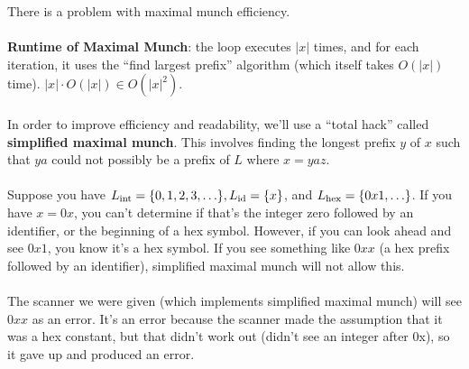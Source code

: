 \documentclass[]{article}
\DeclarePairedDelimiter{\set}{\lbrace}{\rbrace}
\theoremstyle{definition}
\begin{document}
			There is a problem with maximal munch \textendash{} efficiency.
			\\ \\
			\textbf{Runtime of Maximal Munch}: the loop executes $|x|$ times, and for each iteration, it uses the ``find largest prefix'' algorithm (which itself takes $O(|x|)$ time). $|x| \cdot O(|x|) \in O(|x|^2)$.
			\\ \\
			In order to improve efficiency and readability, we'll use a ``total hack'' called \textbf{simplified maximal munch}. This involves finding the longest prefix $y$ of $x$ such that $ya$ could not possibly be a prefix of $L$ where $x = yaz$.
			\\ \\
			Suppose you have $L_{\text{int}} = \set{0, 1, 2, 3, \ldots}, L_{\text{id}} = \set{x}$, and $L_{\text{hex}} = \set{0x1, \ldots}$. If you have $x = 0x$, you can't determine if that's the integer zero followed by an identifier, or the beginning of a hex symbol. However, if you can look ahead and see $0x1$, you know it's a hex symbol. If you see something like $0xx$ (a hex prefix followed by an identifier), simplified maximal munch will not allow this.
			\\ \\
			The scanner we were given (which implements simplified maximal munch) will see $0xx$ as an error. It's an error because the scanner made the assumption that it was a hex constant, but that didn't work out (didn't see an integer after 0x), so it gave up and produced an error.
\end{document}
